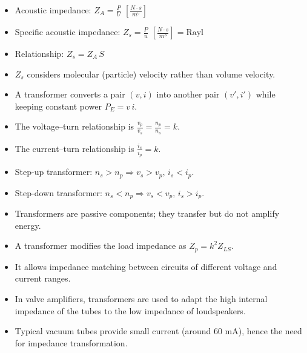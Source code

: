 \begin{tcolorbox}[colback=gray!10!white,colframe=black,title=\textbf{Summary – Specific Acoustic Impedance}]
\begin{itemize}
    \item Acoustic impedance: \( Z_A = \frac{P}{U} \) \([\frac{N \cdot s}{m^5}]\)
    \item Specific acoustic impedance: \( Z_s = \frac{P}{u} \) \([\frac{N \cdot s}{m^3}] = \text{Rayl}\)
    \item Relationship: \( Z_s = Z_A \, S \)
    \item \( Z_s \) considers molecular (particle) velocity rather than volume velocity.
\end{itemize}
\end{tcolorbox}


\begin{tcolorbox}[colback=gray!10!white,colframe=black,title=\textbf{Summary – Signal Transformer}]
\begin{itemize}
    \item A transformer converts a pair \((v, i)\) into another pair \((v', i')\) while keeping constant power \( P_E = v \, i \).
    \item The voltage–turn relationship is \( \frac{v_p}{v_s} = \frac{n_p}{n_s} = k \).
    \item The current–turn relationship is \( \frac{i_s}{i_p} = k \).
    \item Step-up transformer: \( n_s > n_p \Rightarrow v_s > v_p, \, i_s < i_p \).
    \item Step-down transformer: \( n_s < n_p \Rightarrow v_s < v_p, \, i_s > i_p \).
    \item Transformers are passive components; they transfer but do not amplify energy.
\end{itemize}
\end{tcolorbox}



\begin{tcolorbox}[colback=gray!10!white,colframe=black,title=\textbf{Remarks}]
\begin{itemize}
    \item A transformer modifies the load impedance as \( Z_p = k^2 Z_{LS} \).
    \item It allows impedance matching between circuits of different voltage and current ranges.
    \item In valve amplifiers, transformers are used to adapt the high internal impedance of the tubes to the low impedance of loudspeakers.
    \item Typical vacuum tubes provide small current (around 60 mA), hence the need for impedance transformation.
\end{itemize}
\end{tcolorbox}



